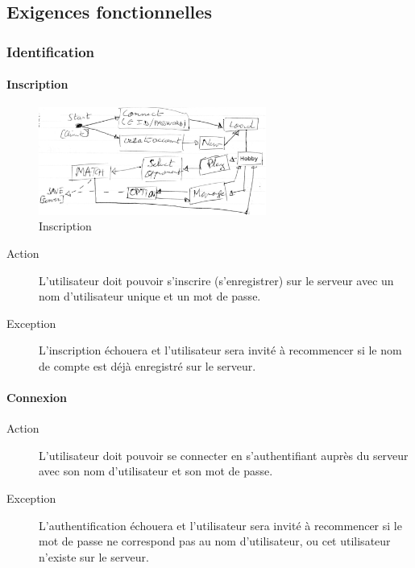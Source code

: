 \documentclass[a4paper]{article}
\begin{document}
\subsection{Exigences fonctionnelles}

\subsubsection{Identification}
\paragraph{Inscription}
\begin{figure}[h]
   \caption{\label{1} Inscription}
   \begin{center}
   \includegraphics[height=100pt]{../pv/pv1/schema1_pv1.jpg}
   \end{center}
\end{figure}
\begin{description}
\item[Action] L'\gls{utilisateur} doit pouvoir s'inscrire (s'enregistrer) sur le \gls{serveur} avec un nom d'\gls{utilisateur} unique et un mot de passe.
\item[Exception] L'inscription échouera et l'\gls{utilisateur} sera invité à recommencer si le nom de compte est déjà enregistré sur le \gls{serveur}.
\end{description}

\paragraph{Connexion}
\begin{description}
\item[Action] L'\gls{utilisateur} doit pouvoir se connecter en s'authentifiant auprès du \gls{serveur} avec son nom d'\gls{utilisateur} et son mot de passe.
\item[Exception] L'authentification échouera et l'\gls{utilisateur} sera invité à recommencer si le mot de passe ne correspond pas au nom d'\gls{utilisateur}, ou cet \gls{utilisateur} n'existe sur le \gls{serveur}.
\end{description}
\end{document}
